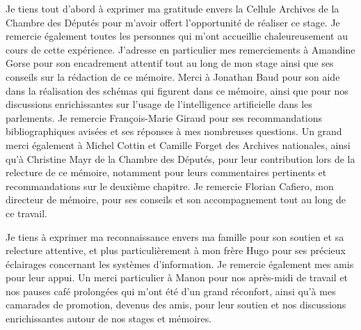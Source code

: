Je tiens tout d'abord à exprimer ma gratitude envers la Cellule Archives de la Chambre des Députés pour m'avoir offert l'opportunité de réaliser ce stage. Je remercie également toutes les personnes qui m'ont accueillie chaleureusement au cours de cette expérience.
J'adresse en particulier mes remerciements à Amandine Gorse pour son encadrement attentif tout au long de mon stage ainsi que ses conseils sur la rédaction de ce mémoire. Merci à Jonathan Baud pour son aide dans la réalisation des schémas qui figurent dans ce mémoire, ainsi que pour nos discussions enrichissantes sur l'usage de l'intelligence artificielle dans les parlements.
Je remercie François-Marie Giraud pour ses recommandations bibliographiques avisées et ses réponses à mes nombreuses questions. Un grand merci également à Michel Cottin et Camille Forget des Archives nationales, ainsi qu'à Christine Mayr de la Chambre des Députés, pour leur contribution lors de la relecture de ce mémoire, notamment pour leurs commentaires pertinents et recommandations sur le deuxième chapitre.
Je remercie Florian Cafiero, mon directeur de mémoire, pour ses conseils et son accompagnement tout au long de ce travail.

Je tiens à exprimer ma reconnaissance envers ma famille pour son soutien et sa relecture attentive, et plus particulièrement à mon frère Hugo pour ses précieux éclairages concernant les systèmes d'information. Je remercie également mes amis pour leur appui. Un merci particulier à Manon pour nos après-midi de travail et nos pauses café prolongées qui m'ont été d'un grand réconfort, ainsi qu'à mes camarades de promotion, devenus des amis, pour leur soutien et nos discussions enrichissantes autour de nos stages et mémoires.


